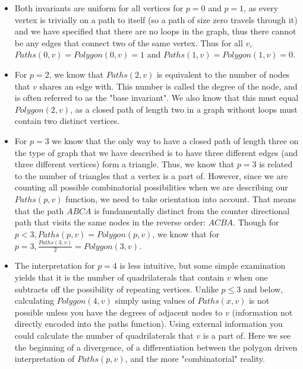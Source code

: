 \documentclass[a4paper,12pt]{article}
\begin{document}
\begin{itemize}
    \item{Both invariants are uniform for all vertices for \(p = 0\) and \(p = 1\), as every vertex is trivially on a path to itself (so a path of size zero travels through it) and we have specified that there are no loops in the graph, thus there cannot be any edges that connect two of the same vertex.  Thus for all \(v\), \(Paths(0, v) = Polygon(0, v) = 1\) and \(Paths(1, v) =  Polygon(1, v) = 0\).}
    \item{For \(p = 2\), we know that \(Paths(2, v)\) is equivalent to the number of nodes that \(v\) shares an edge with. This number is called the degree of the node, and is often referred to as the "base invariant". We also know that this must equal \(Polygon(2, v)\), as a closed path of length two in a graph without loops must contain two distinct vertices.}
    \item{For \(p = 3\) we know that the only way to have a closed path of length three on the type of graph that we have described is to have three different edges (and three different vertices) form a triangle.  Thus, we know that \(p = 3\) is related to the number of triangles that a vertex is a part of.  However, since we are counting all possible combinatorial possibilities when we are describing our \(Paths(p, v)\) function, we need to take orientation into account.  That means that the path \(ABCA\) is fundamentally distinct from the counter directional path that visits the same nodes in the reverse order: \(ACBA\).  Though for \(p < 3, Paths(p, v) = Polygon(p, v)\), we know that for \(p = 3, \frac{Paths(3, v)}{2} = Polygon(3, v)\).}
     \item{The interpretation for \(p = 4\) is less intuitive, but some simple examination yields that it is the number of quadrilaterals that contain \(v\) when one subtracts off the possibility of repeating vertices.  Unlike \(p \leq 3\) and below, calculating \(Polygon(4, v)\) simply using values of \(Paths(x, v)\) is not possible unless you have the degrees of adjacent nodes to \(v\) (information not directly encoded into the paths function).  Using external information you could calculate the number of quadrilaterals that \(v\) is a part of.  Here we see the beginning of a divergence, of a differentiation between the polygon driven interpretation of \(Paths(p, v)\), and the more "combinatorial" reality.}
\end{itemize}
\end{document}
